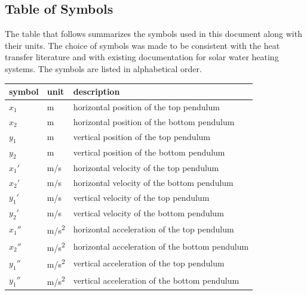 \documentclass[12pt]{article}
\begin{document}
\subsection{Table of Symbols}\label{sec_tableofsymbols}

The table that follows summarizes the symbols used in this document along with
their units. The choice of symbols was made to be consistent with the heat
transfer literature and with existing documentation for solar water heating
systems. The symbols are listed in alphabetical order.
~\newline

\renewcommand{\arraystretch}{1.2}
\begin{table}[H]
  \centering
  \noindent \begin{longtable*}{l l p{12cm}} 
  \toprule
  \textbf{symbol} & \textbf{unit} & \textbf{description}\\
  \midrule 
  $x_1$ & \si[per-mode=symbol] {\metre} & horizontal position of the top pendulum 
  \\
  $x_2$ & \si[per-mode=symbol] {\metre} & horizontal position of the bottom pendulum 
  \\
  $y_1$ & \si[per-mode=symbol] {\metre} & vertical position of the top pendulum 
  \\
  $y_2$ & \si[per-mode=symbol] {\metre} & vertical position of the bottom pendulum 
  \\
  ${x_1}'$ & \si[per-mode=symbol] {\metre\per\second} & horizontal velocity of the top pendulum 
  \\
  ${x_2}'$ & \si[per-mode=symbol] {\metre\per\second} & horizontal velocity of the bottom pendulum 
  \\
  ${y_1}'$ & \si[per-mode=symbol] {\metre\per\second} & vertical velocity of the top pendulum 
  \\
  ${y_2}'$ & \si[per-mode=symbol] {\metre\per\second} & vertical velocity of the bottom pendulum 
  \\
  ${x_1}''$ & \si[per-mode=symbol] {\metre\per\square\second} & horizontal acceleration of the top pendulum 
  \\
  ${x_2}''$ & \si[per-mode=symbol] {\metre\per\square\second} & horizontal acceleration of the bottom pendulum 
  \\
  ${y_1}''$ & \si[per-mode=symbol] {\metre\per\square\second} & vertical acceleration of the top pendulum 
  \\
  ${y_1}''$ & \si[per-mode=symbol] {\metre\per\square\second} & vertical acceleration of the bottom pendulum 

\end{longtable*}
\end{table}
\end{document}
